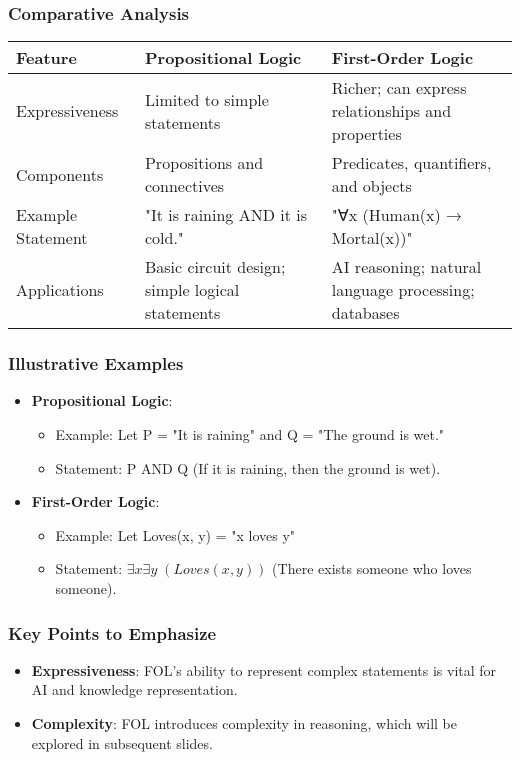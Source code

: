 \documentclass[aspectratio=169]{beamer}
\begin{document}
\begin{frame}[fragile]
    \frametitle{Comparative Analysis}
    \begin{tabular}{|l|l|l|}
        \hline
        \textbf{Feature} & \textbf{Propositional Logic} & \textbf{First-Order Logic} \\
        \hline
        Expressiveness & Limited to simple statements & Richer; can express relationships and properties \\
        \hline
        Components & Propositions and connectives & Predicates, quantifiers, and objects \\
        \hline
        Example Statement & "It is raining AND it is cold." & "∀x (Human(x) → Mortal(x))" \\
        \hline
        Applications & Basic circuit design; simple logical statements & AI reasoning; natural language processing; databases \\
        \hline
    \end{tabular}
\end{frame}

\begin{frame}[fragile]
    \frametitle{Illustrative Examples}
    \begin{itemize}
        \item \textbf{Propositional Logic}:
        \begin{itemize}
            \item Example: Let P = "It is raining" and Q = "The ground is wet."
            \item Statement: P AND Q (If it is raining, then the ground is wet).
        \end{itemize}
        
        \item \textbf{First-Order Logic}:
        \begin{itemize}
            \item Example: Let Loves(x, y) = "x loves y"
            \item Statement: $\exists x \exists y \; (Loves(x, y))$ (There exists someone who loves someone).
        \end{itemize}
    \end{itemize}
\end{frame}

\begin{frame}[fragile]
    \frametitle{Key Points to Emphasize}
    \begin{itemize}
        \item \textbf{Expressiveness}: FOL’s ability to represent complex statements is vital for AI and knowledge representation.
        \item \textbf{Complexity}: FOL introduces complexity in reasoning, which will be explored in subsequent slides.
    \end{itemize}
\end{frame}
\end{document}
